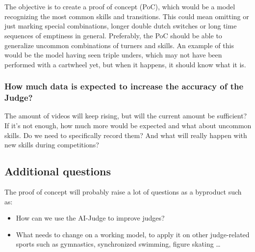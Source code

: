 \section{}%
\label{sec:onderzoeksdoelstelling}

The objective is to create a proof of concept (PoC), which would be a model recognizing the most common skills and transitions.
This could mean omitting or just marking special combinations, longer double dutch switches or long time sequences of emptiness in general. Preferably, the PoC should be able to generalize uncommon combinations of turners and skills. An example of this would be the model having seen triple unders, which may not have been performed with a cartwheel yet, but when it happens, it should know what it is.

\subsubsection{How much data is expected to increase the accuracy of the Judge?}
\label{subsubsec:intro-question-expected-data-to-increase-accuracy}

The amount of videos will keep rising, but will the current amount be sufficient? If it's not enough, how much more would be expected and what about uncommon skills. Do we need to specifically record them? And what will really happen with new skills during competitions?

\subsection{Additional questions}
\label{subsubsec:intro-question-additional}

The proof of concept will probably raise a lot of questions as a byproduct such as:

\begin{itemize}
    \item How can we use the AI-Judge to improve judges?
    \item What needs to change on a working model, to apply it on other judge-related sports such as gymnastics, synchronized swimming, figure skating \dots
\end{itemize}


\section{}%
\label{sec:opzet-bachelorproef}

